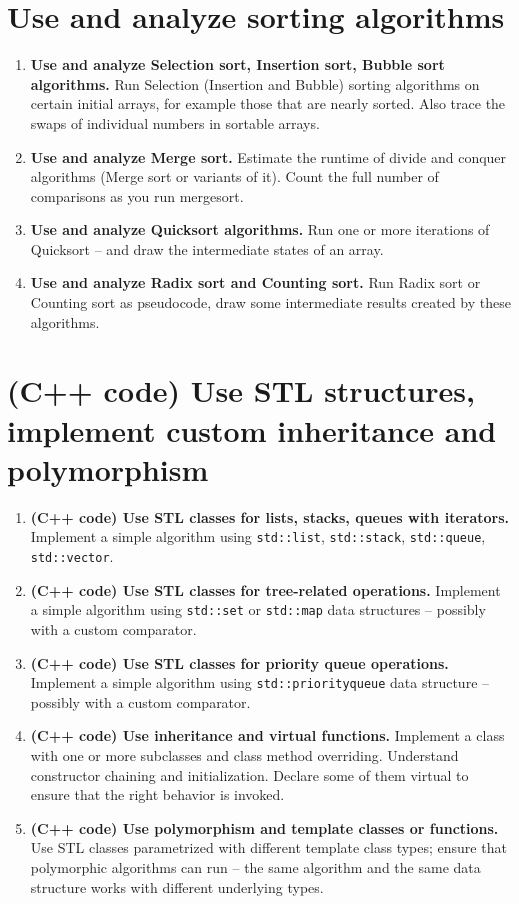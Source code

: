 \documentclass[a4paper,12pt]{article}
\begin{document}
\section{Use and analyze sorting algorithms}

\begin{enumerate}[label=5.\Alph*.]
\item {\bf Use and analyze Selection sort, Insertion sort, Bubble sort algorithms.}
Run Selection (Insertion and Bubble) sorting algorithms on certain initial arrays, 
for example those that are nearly sorted. Also trace the swaps of individual numbers
in sortable arrays.
\item {\bf Use and analyze Merge sort.}
Estimate the runtime of divide and conquer algorithms (Merge sort or variants of it).
Count the full number of comparisons as you run mergesort. 
\item {\bf Use and analyze Quicksort algorithms.}
Run one or more iterations of Quicksort -- and draw the intermediate states of an array. 
\item {\bf Use and analyze Radix sort and Counting sort.}
Run Radix sort or Counting sort as pseudocode, draw some intermediate results created 
by these algorithms.
\end{enumerate}

\section{(C++ code) Use STL structures, implement custom inheritance and polymorphism}

\begin{enumerate}[label=6.\Alph*.]
\item {\bf (C++ code) Use STL classes for lists, stacks, queues with iterators.}
Implement a simple algorithm using {\tt std::list}, {\tt std::stack}, {\tt std::queue}, 
{\tt std::vector}.
\item {\bf (C++ code) Use STL classes for tree-related operations.}
Implement a simple algorithm using {\tt std::set} or {\tt std::map} data structures 
-- possibly with a custom comparator.
\item {\bf (C++ code) Use STL classes for priority queue operations.}
Implement a simple algorithm using {\tt std::priority\textunderscore{}queue} data structure
-- possibly with a custom comparator.
\item {\bf (C++ code) Use inheritance and virtual functions.}
Implement a class with one or more subclasses and class method overriding. 
Understand constructor chaining and initialization. 
Declare some of them virtual to ensure that the right behavior is invoked.
\item {\bf (C++ code) Use polymorphism and template classes or functions.}
Use STL classes parametrized with different template class types; 
ensure that polymorphic algorithms can run -- the same algorithm and the same 
data structure works with different underlying types.
\end{enumerate}
\end{document}
